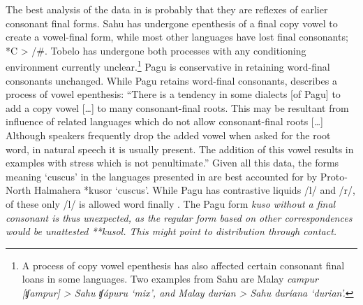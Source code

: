The best analysis of the data 
in  is probably that they are
reflexes of earlier consonant final forms.
Sahu has undergone epenthesis of a final copy vowel to create
a vowel-final form, while most other languages have lost final consonants; *C > {\0} /{\gap}{\#}.
Tobelo has undergone both processes with any conditioning environment currently unclear.\footnote{
		A process of copy vowel epenthesis has also affected certain consonant
		final loans in some  languages.
		Two examples from Sahu are Malay \it{campur} [ʧampur] > Sahu \it{ʧápuru} ‘mix’,
		and Malay \it{durian} > Sahu \it{duríana} ‘durian’.}
Pagu is conservative in retaining word-final consonants unchanged.
While Pagu
retains word-final consonants, \citet[78]{Wimbish1992} describes a process of vowel epenthesis:
“There is a tendency in some dialects [of Pagu] to add a copy
vowel [{\ldots}] to many consonant-final roots.
This may be resultant from influence of related languages which
do not allow consonant-final roots [{\ldots}] Although speakers
frequently drop the added vowel when asked for the root word,
in natural speech it is usually present.
The addition of this vowel results in examples with stress which
is not penultimate.” 
Given all this data,
the forms meaning ‘cuscus’ in the  languages
presented in  are best accounted for by Proto-North Halmahera *kusor ‘cuscus’.
While Pagu has contrastive liquids /l/
and /r/, of these only /l/ is allowed word finally \citep[78]{Wimbish1992}.
The Pagu form \it{kuso} without a final consonant is thus unexpected,
as the regular form based on other correspondences would be unattested **kusol.
This might point to distribution through contact.